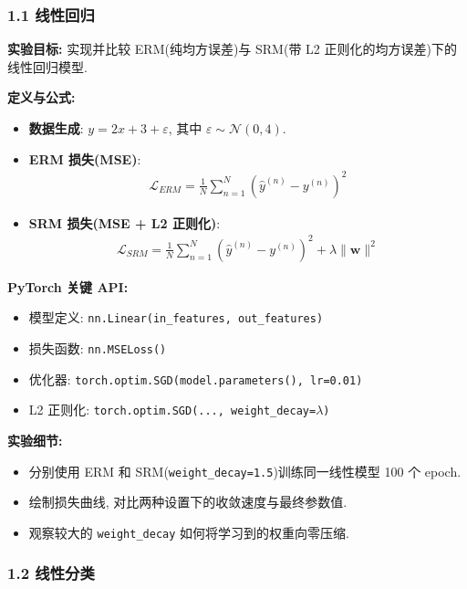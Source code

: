 \documentclass{../../nndlcourse}
\begin{document}
\subsubsection*{1.1 线性回归}

\textbf{实验目标: }实现并比较 ERM(纯均方误差)与 SRM(带 L2 正则化的均方误差)下的线性回归模型.

\textbf{定义与公式: }
\begin{itemize}
    \item \textbf{数据生成}: $y = 2x + 3 + \varepsilon$, 其中 $\varepsilon \sim \mathcal{N}(0, 4)$.
    \item \textbf{ERM 损失(MSE)}: 
    \begin{align}
        \mathcal{L}_{ERM} = \frac{1}{N}\sum_{n=1}^N\left(\hat{y}^{(n)} - y^{(n)}\right)^2
    \end{align}
    \item \textbf{SRM 损失(MSE + L2 正则化)}: 
    \begin{align}
        \mathcal{L}_{SRM} = \frac{1}{N}\sum_{n=1}^N\left(\hat{y}^{(n)} - y^{(n)}\right)^2 + \lambda\|\boldsymbol{w}\|^2
    \end{align}
\end{itemize}

\textbf{PyTorch 关键 API: }
\begin{itemize}
    \item 模型定义: \texttt{nn.Linear(in\_features, out\_features)}
    \item 损失函数: \texttt{nn.MSELoss()}
    \item 优化器: \texttt{torch.optim.SGD(model.parameters(), lr=0.01)}
    \item L2 正则化: \texttt{torch.optim.SGD(..., weight\_decay=\(\lambda\))}
\end{itemize}

\textbf{实验细节: }
\begin{itemize}
    \item 分别使用 ERM 和 SRM(\texttt{weight\_decay=1.5})训练同一线性模型 100 个 epoch.
    \item 绘制损失曲线, 对比两种设置下的收敛速度与最终参数值.
    \item 观察较大的 \texttt{weight\_decay} 如何将学习到的权重向零压缩.
\end{itemize}

\subsubsection*{1.2 线性分类}
\end{document}
